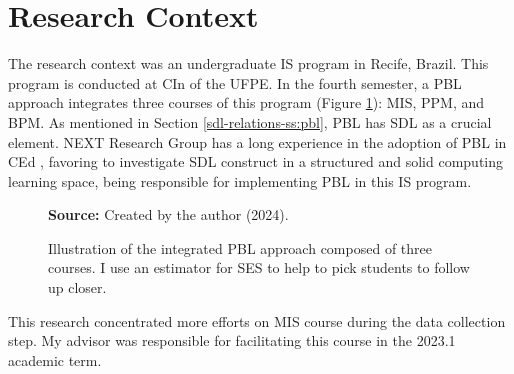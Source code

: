 \section{Research Context}
\label{res-des-sec:context}

The research context was an undergraduate \gls{IS} program in Recife, Brazil. This program is conducted at \gls{CIn} of the \gls{UFPE}. In the fourth semester, a \gls{PBL} approach integrates three courses of this program (Figure \ref{fig:pbl-group}): \gls{MIS}, \gls{PPM}, and \gls{BPM}. As mentioned in Section \ref{sdl-relations-ss:pbl}, \gls{PBL} has \gls{SDL} as a crucial element. \gls{NEXT} Research Group has a long experience in the adoption of \gls{PBL} in \gls{CEd} \cite{santos:2021}, favoring to investigate \gls{SDL} construct in a structured and solid computing learning space, being responsible for implementing \gls{PBL} in this \gls{IS} program.

\begin{figure}[ht!]
\centering

\caption{\textmd{Illustration of the integrated \acrshort{PBL} approach composed of three courses. I use an estimator for \acrfull{SES} to help to pick students to follow up closer.}}
\label{fig:pbl-group}

\par\medskip\ABNTEXfontereduzida\selectfont\textbf{Source:} Created by the author (2024).
\end{figure}

This research concentrated more efforts on \gls{MIS} course during the data collection step. My advisor was responsible for facilitating this course in the 2023.1 academic term.

